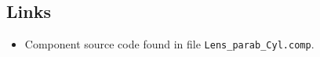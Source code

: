 \subsection*{Links}
\begin{itemize}
  \item Component source code found in file \texttt{Lens\_parab\_Cyl.comp}.
\end{itemize}
